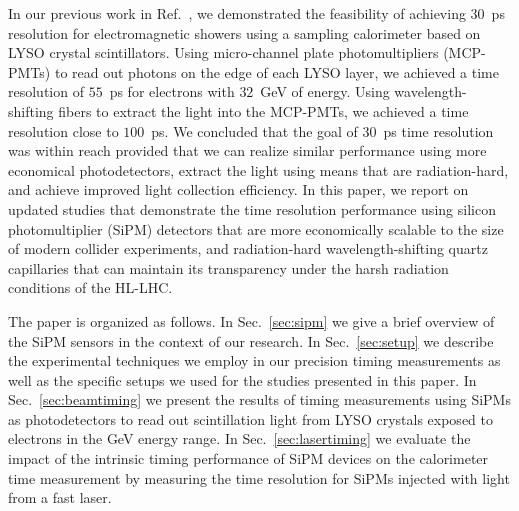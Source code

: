 In our previous work in Ref.~\cite{Anderson:2015gha}, we demonstrated the
feasibility of achieving $30$~ps resolution for electromagnetic showers using a
sampling calorimeter based on LYSO crystal scintillators. Using micro-channel
plate photomultipliers (MCP-PMTs) to read out photons on the edge of each LYSO
layer, we achieved a time resolution of $55$~ps for electrons with $32$~GeV of
energy. Using wavelength-shifting fibers to extract the light into the MCP-PMTs,
we achieved a time resolution close to $100$~ps. We concluded that the goal of
$30$~ps time resolution was within reach provided that we can realize similar
performance using more economical photodetectors, extract the light using means
that are radiation-hard, and achieve improved light collection efficiency. In
this paper, we report on updated studies that demonstrate the time resolution
performance using silicon photomultiplier (SiPM) detectors that are more
economically scalable to the size of modern collider experiments, and 
radiation-hard wavelength-shifting quartz capillaries 
that can maintain its transparency under the harsh radiation conditions of the HL-LHC. 

The paper is organized as follows. In Sec.~\ref{sec:sipm} we give a brief
overview of the SiPM sensors in the context of our research. In
Sec.~\ref{sec:setup} we describe the experimental techniques we employ in our
precision timing measurements as well as the specific setups we used for the
studies presented in this paper. In Sec.~\ref{sec:beamtiming} we present the
results of timing measurements using SiPMs as photodetectors to read out
scintillation light from LYSO crystals exposed to electrons in the GeV energy
range. In Sec.~\ref{sec:lasertiming} we evaluate the impact of the intrinsic
timing performance of SiPM devices on the calorimeter time measurement by
measuring the time resolution for SiPMs injected with light from a fast laser.
